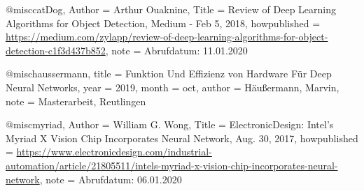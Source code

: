 @misc{catDog,
  Author = {Arthur Ouaknine},
  Title = {{Review of Deep Learning Algorithms for Object Detection}, Medium - Feb 5, 2018},
  howpublished = {\url{https://medium.com/zylapp/review-of-deep-learning-algorithms-for-object-detection-c1f3d437b852}},
  note = {Abrufdatum: 11.01.2020}
}

@misc{haussermann,
  title = {Funktion Und {{Effizienz}} von {{Hardware}} F{\"u}r {{Deep Neural Networks}}},
  year = {2019},
  month = oct,
  author = {H{\"a}u{\ss}ermann, Marvin},
  note = {Masterarbeit, Reutlingen}
}

 @misc{myriad,
  Author = {William G. Wong},
  Title = {{ElectronicDesign: Intel’s Myriad X Vision Chip Incorporates Neural Network}, Aug. 30, 2017},
  howpublished = {\url{https://www.electronicdesign.com/industrial-automation/article/21805511/intels-myriad-x-vision-chip-incorporates-neural-network}},
  note = {Abrufdatum: 06.01.2020}
}
